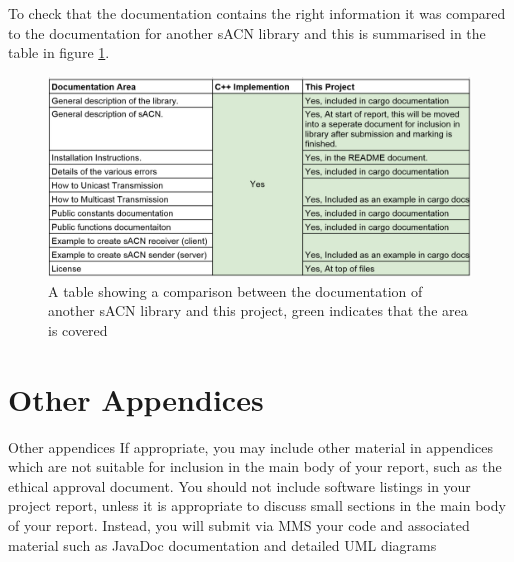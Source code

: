\documentclass[11pt,a4paper]{article}
\begin{document}
To check that the documentation contains the right information it was compared to the documentation for another sACN library \cite{C_IMPL} and this is summarised in the table in figure \ref{DOC_COMPARISON}.

\begin{figure}[H]
	\label{DOC_COMPARISON}
	\includegraphics[width=\textwidth]{documentation-comparison-table}
	\caption{A table showing a comparison between the documentation of another sACN library \cite{C_IMPL} and this project, green indicates that the area is covered}
\end{figure}

\section{Other Appendices}
Other
appendices
If appropriate, you may include other material in
appendices which are not suitable for inclusion in the
main body of your report, such as the ethical approval
document.
You should not include software listings in your project report, unless it is
appropriate to discuss small sections in the main body of your report. Instead,
you will submit via MMS your code and associated material such as JavaDoc
documentation and detailed UML diagrams
\end{document}
